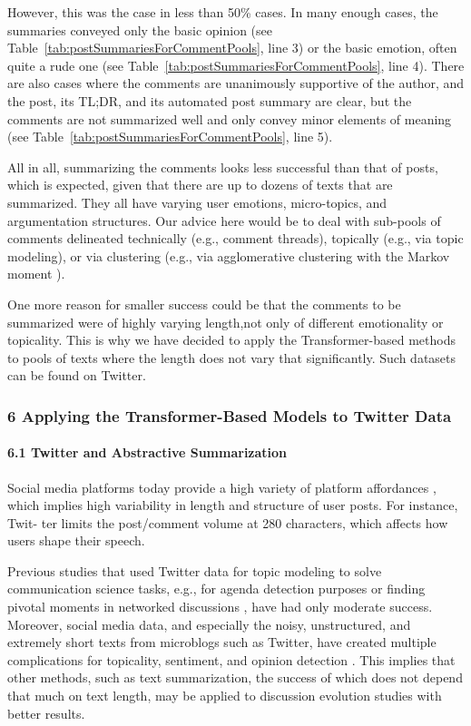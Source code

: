 However, this was the case in less than 50\% cases. In many enough cases, the summaries conveyed only the basic opinion (see Table~\cref{tab:postSummariesForCommentPools}, line 3) or the basic emotion, often quite a rude one (see Table~\cref{tab:postSummariesForCommentPools}, line 4). There are also cases where the comments are unanimously supportive of the author, and the post, its TL;DR, and its automated post summary are clear, but the comments are not summarized well and only convey minor elements of meaning (see Table~\cref{tab:postSummariesForCommentPools}, line 5).

All in all, summarizing the comments looks less successful than that of posts, which is expected, given that there are up to dozens of texts that are summarized. They all have varying user emotions, micro-topics, and argumentation structures. Our advice here would be to deal with sub-pools of comments delineated technically (e.g., comment threads), topically (e.g., via topic modeling), or via clustering (e.g., via agglomerative clustering with the Markov moment \cite{BodrunovaOrekhovBlekanov}).

One more reason for smaller success could be that the comments to be summarized were of highly varying length,not only of different emotionality or topicality. This is why we have decided to apply the Transformer-based methods to pools of texts where the length does not vary that significantly. Such datasets can be found on Twitter.

\subsubsection{6 Applying the Transformer-Based Models to Twitter Data}

\paragraph{6.1 Twitter and Abstractive Summarization}
Social media platforms today provide a high variety of platform affordances \cite{BucherHelmond}, which implies high variability in length and structure of user posts. For instance, Twit- ter limits the post/comment volume at 280 characters, which affects how users shape their speech.

Previous studies that used Twitter data for topic modeling to solve communication science tasks, e.g., for agenda detection purposes or finding pivotal moments in networked discussions \cite{SmoliarovaBodrunovaYakunin}, have had only moderate success. Moreover, social media data, and especially the noisy, unstructured, and extremely short texts from microblogs such as Twitter, have created multiple complications for topicality, sentiment, and opinion detection \cite{BlekanovBodrunovaZhuravleva}. This implies that other methods, such as text summarization, the success of which does not depend that much on text length, may be applied to discussion evolution studies with better results.

